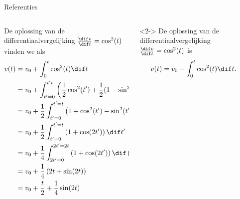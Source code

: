 \begin{frame}[fragile]{Referenties}
    \begin{columns}
        \begin{column}{0.5\textwidth}
            {
            {\tiny De oplossing van de differentiaalvergelijking $ \frac{\dif v}{\dif t} = \cos^2(t) $
            vinden we als
            \begin{align*}
                v(t) &= v_0 + \int_{0}^{t}\cos^2(t)\dif t\\
                &= v_0 + \int_{t'=0}^{t't}\left(\frac{1}{2}\cos^2(t')+\frac{1}{2}(1-\sin^2(t'))\right)\dif t'\\
                &= v_0 + \frac{1}{2}\int_{t'=0}^{t'=t}\left(1+\cos^2(t')-\sin^2(t')\right)\dif t'\\
                &= v_0 + \frac{1}{2}\int_{t'=0}^{t'=t}\left(1+\cos(2t')\right)\dif t'\\
                &= v_0 + \frac{1}{4}\int_{2t'=0}^{2t'=2t}\left(1+\cos(2t')\right)\dif\, (2t')\\
                &= v_0 + \frac{1}{4}\left(2t+\sin(2t)\right)\\
                &= v_0 + \frac{t}{2} + \frac{1}{4}\sin(2t)
            \end{align*}}}
        \end{column}
        \begin{column}{0.5\textwidth}
            \begin{onlyenv}<2->%
                {\tiny
                De oplossing van de differentiaalvergelijking $ \frac{\dif v}{\dif t} = \cos^2(t) $ is
                \begin{align}\label{eq:exprVelocity}
                    v(t) &= v_0 + \int_{0}^{t}\cos^2(t)\dif t.

\end{align}}
\end{onlyenv}
\end{column}
\end{columns}
\end{frame}
